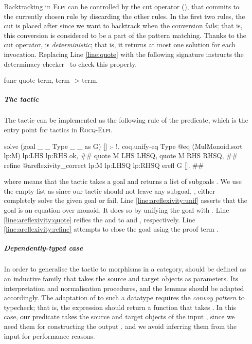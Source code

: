 \documentclass[a4paper,UKenglish,cleveref,autoref]{lipics-v2021}
\newcommand\evar[1]{\ensuremath{?_{\texttt{#1}}}}
\newcommand{\Elpi}{{\sffamily\scshape Elpi}\xspace}
\newcommand{\RocqElpi}{{\sffamily\scshape Rocq-Elpi}\xspace}
\begin{document}
Backtracking in \Elpi can be controlled by the cut operator (\elpi{!}), that commits to the
currently chosen rule by discarding the other rules.
In the first two rules, the cut is placed after  since we want to backtrack when
the conversion fails; that is, this conversion is considered to be a part of the pattern matching.
Thanks to the cut operator,  is \emph{deterministic}; that is, it returns at most one
solution for each invocation.
Replacing Line \ref{line:quote} with the following signature instructs the determinacy
checker~\cite{FissoreTassi26} to check this property.
\begin{elpicode}
func quote term, term -> term.
\end{elpicode}

\subparagraph{The tactic}
The  tactic can be implemented as the following rule of the 
predicate, which is the entry point for tactics in \RocqElpi.
\begin{elpicode}
solve (goal _ _ Type _ _ as G) [] :- !,
  coq.unify-eq Type {{ @eq (MulMonoid.sort lp:M) lp:LHS lp:RHS }} ok, #\label{line:areflexivity:unif}#
  quote M LHS LHSQ, quote M RHS RHSQ, #\label{line:areflexivity:quote}#
  refine {{ @areflexivity_correct lp:M lp:LHSQ lp:RHSQ erefl }} G [].  #\label{line:areflexivity:refine}#
\end{elpicode}
where  means that the tactic takes a goal  and returns a list of subgoals
. We use the empty list \elpi{[]} as  since our tactic should not leave any
subgoal, \ie, either completely solve the given goal  or fail.
Line \ref{line:areflexivity:unif} asserts that the goal is an equation over monoid. It does so by
unifying the goal with \rocq{@eq (MulMonoid.sort #$\evar{M}$#) #$\evar{LHS}$# #$\evar{RHS}$#}.
Line \ref{line:areflexivity:quote} reifies the  and  to  and
, respectively.
Line \ref{line:areflexivity:refine} attempts to close the goal  using the proof term
.

\subparagraph{Dependently-typed case}
In order to generalise the  tactic to morphisms in a category, 
should be defined as an inductive family that takes the source and target objects as parameters.
Its interpretation and normalisation procedures, and the lemmas should be adapted accordingly.
The adaptation of  to such a datatype requires the \emph{convoy pattern} to typecheck;
that is, the  expression should return a function that takes .
In this case, our  predicate takes the source and target objects of the input ,
since we need them for constructing the output , and we avoid inferring them from the
input for performance reasons.
\end{document}
